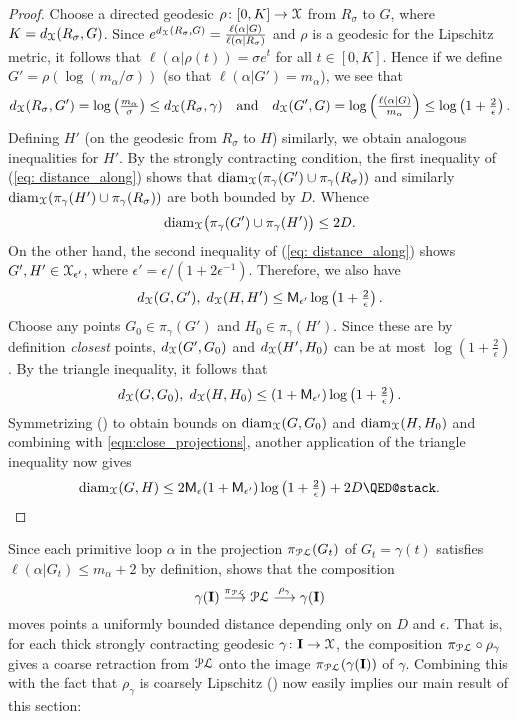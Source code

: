 \documentclass[letterpaper,fleqn]{article}
\theoremstyle{plain}
\theoremstyle{definition}
\DeclareMathOperator{\diam}{diam}
\newcommand{\inv}{^{-1}}
\newcommand{\pl}{{\EuScript{PL}}} %
\newcommand{\os}{{\EuScript X}} %
\newcommand{\X}{\os}
\newcommand{\plproj}{\pi_\pl} %
\newcommand{\minlen}{m}  %
\newcommand{\minpts}{\rho} %
\newcommand{\sym}{{\sf M}} %
\renewcommand{\diam}{\mathrm{diam}}
\newcommand{\I}{\mathbf{I}}
\begin{document}
\begin{proof}
Choose a directed geodesic $\rho\colon [0,K] \to \os$ from $R_\sigma$ to $G$, where $K = d_{\X}(R_\sigma,G)$. Since $e^{d_\os(R_\sigma,G)} = \frac{\ell(\alpha\vert G)}{\ell(\alpha\vert R_\sigma)}$ and $\rho$ is a geodesic for the Lipschitz metric, it follows that $\ell(\alpha\vert \rho(t)) = \sigma e^t$ for all $t\in [0,K]$. Hence if we define $G' = \rho\left(\log(m_\alpha / \sigma)\right)$ (so that $\ell(\alpha\vert G') = m_\alpha$), we see that
\begin{align} \label{eq: distance_along}
d_\os(R_\sigma,G') = \log\left(\tfrac{m_\alpha}{\sigma}\right) \le d_\os(R_\sigma,\gamma)\quad\text{and}\quad d_\os(G',G) = \log\left(\tfrac{\ell(\alpha\vert G)}{m_\alpha}\right) \le \log\left(1 + \tfrac{2}{\epsilon}\right).
\end{align}
Defining $H'$ (on the geodesic from $R_\sigma$ to $H$) similarly, we obtain analogous inequalities for $H'$.
By the strongly contracting condition, the first inequality of (\ref{eq: distance_along}) shows that $\diam_\os(\pi_\gamma(G')\cup \pi_\gamma(R_\sigma))$ and similarly $\diam_\os(\pi_\gamma(H') \cup \pi_\gamma(R_\sigma))$ are both bounded by $D$. Whence
\begin{equation}\label{eqn:close_projections}
\diam_\os\big(\pi_\gamma(G')\cup\pi_\gamma(H')\big) \le 2D.
\end{equation}
On the other hand, the second inequality of (\ref{eq: distance_along}) shows $G',H'\in \os_{\epsilon'}$, where $\epsilon' = \epsilon/(1+2\epsilon\inv)$. Therefore, we also have
\[d_\os(G,G'),\; d_\os(H,H') \le \sym_{\epsilon'}\log\left(1+\tfrac{2}{\epsilon}\right).\]
Choose any points $G_0\in \pi_\gamma(G')$ and $H_0\in \pi_\gamma(H')$. Since these are by definition \emph{closest} points, $d_\os(G',G_0)$ and $d_\os(H',H_0)$ can be at most $\log\left(1 + \tfrac{2}{\epsilon}\right)$. By the triangle inequality, it follows that
\[d_\os(G,G_0),\; d_\os(H,H_0)\le (1 + \sym_{\epsilon'})\log\left(1+\tfrac{2}{\epsilon}\right).\]
Symmetrizing () to obtain bounds on $\diam_\os(G,G_0)$ and $\diam_\os(H,H_0)$ and combining with \eqref{eqn:close_projections}, another application of the triangle inequality now gives
\[\diam_\os(G,H) \le 2\sym_{\epsilon}(1+\sym_{\epsilon'})\log\left(1+\tfrac{2}{\epsilon}\right) + 2D \qedhere.\]
\end{proof}



Since each primitive loop $\alpha$ in the projection $\plproj(G_t)$ of $G_t=\gamma(t)$ satisfies $\ell(\alpha\vert G_t) \le \minlen_\alpha +2$ by definition,  shows that the composition
\[\gamma(\I) \overset{\plproj}{\longrightarrow}\pl\overset{\minpts_\gamma}{\longrightarrow}\gamma(\I)\]
moves points a uniformly bounded distance depending only on $D$ and $\epsilon$. That is, for each thick strongly contracting geodesic $\gamma\colon \I\to \os$, the composition $\plproj\circ\minpts_\gamma$ gives a coarse retraction from $\pl$ onto the image $\plproj(\gamma(\I))$ of $\gamma$. Combining this with the fact that $\minpts_\gamma$ is coarsely Lipschitz () now easily implies our main result of this section:
\end{document}
